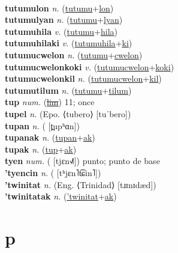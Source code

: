  \label{tutumuec} \\
\textbf{tutumulon} \textit{n.} (\hyperref[tutumu]{tutumu}+\hyperref[lon]{lon})
 \label{tutumulon} \\
\textbf{tutumulyan} \textit{n.} (\hyperref[tutumu]{tutumu}+\hyperref[lyan]{lyan})
 \label{tutumulyan} \\
\textbf{tutumuhila} \textit{v.} (\hyperref[tutumu]{tutumu}+\hyperref[hila]{hila})
 \label{tutumuhila} \\
\textbf{tutumuhilaki} \textit{v.} (\hyperref[tutumuhila]{tutumuhila}+\hyperref[ki]{ki})
 \label{tutumuhilaki} \\
\textbf{tutumucwelon} \textit{n.} (\hyperref[tutumu]{tutumu}+\hyperref[cwelon]{cwelon})
 \label{tutumucwelon} \\
\textbf{tutumucwelonkoki} \textit{v.} (\hyperref[tutumucwelon]{tutumucwelon}+\hyperref[koki]{koki})
 \label{tutumucwelonkoki} \\
\textbf{tutumucwelonkil} \textit{n.} (\hyperref[tutumucwelon]{tutumucwelon}+\hyperref[kil]{kil})
 \label{tutumucwelonkil} \\
\textbf{tutumutilum} \textit{n.} (\hyperref[tutumu]{tutumu}+\hyperref[tilum]{tilum})
 \label{tutumutilum} \\
\textbf{tup} \textit{num.} (\hyperref[lim]{\sout{lim}})
11; once \label{tup} \\
\textbf{tupel} \textit{n.} (Epo. ⟨tubero⟩ [tuˈbero])
 \label{tupel} \\
\textbf{tupan} \textit{n.} ( [t̪upʰɑn])
 \label{tupan} \\
\textbf{tupanak} \textit{n.} (\hyperref[tupan]{tupan}+\hyperref[ak]{ak})
 \label{tupanak} \\
\textbf{tupak} \textit{n.} (\hyperref[tup]{tup}+\hyperref[ak]{ak})
 \label{tupak} \\
\textbf{tyen} \textit{num.} ( [tjɛn˧˩˥])
punto; punto de base \label{tyen} \\
\textbf{'tyencin} \textit{n.} ( [tʰjɛn˥t͡ɕin˥])
 \label{'tyencin} \\
\textbf{'twinitat} \textit{n.} (Eng. ⟨Trinidad⟩ [tɹɪnɪdæd])
 \label{'twinitat} \\
\textbf{'twinitatak} \textit{n.} (\hyperref['twinitat]{'twinitat}+\hyperref[ak]{ak})
 \label{'twinitatak} 

\section{p}

